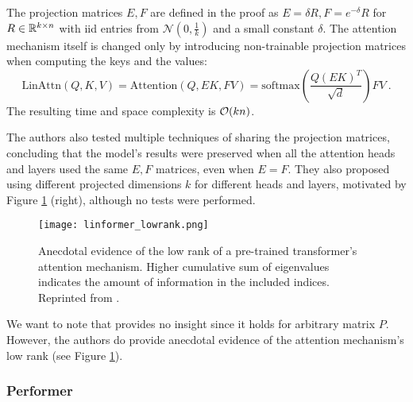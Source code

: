 The projection matrices $E, F$ are defined in the proof as $E=\delta R, F=e^{-\delta}R$ for $R\in\mathbb{R}^{k\times n}$ with iid entries from $\mathcal{N}(0,\frac{1}{k})$ and a small constant $\delta$.
The attention mechanism itself is changed only by introducing non-trainable projection matrices when computing the keys and the values:
\begin{equation}
        \text{LinAttn}(Q,K,V)=\text{Attention}(Q,EK,FV)=
        \text{softmax}\left(\frac{Q(EK)^T}{\sqrt{d}}\right)FV
        \ .
\end{equation}
The resulting time and space complexity is $\mathcal{O}(kn)$. 

The authors also tested multiple techniques of sharing the projection matrices, concluding that the model's results were preserved when all the attention heads and layers used the same $E,F$ matrices, even when $E=F$.
They also proposed using different projected dimensions $k$ for different heads and layers, motivated by Figure \ref{fig:linformer_lowrank} (right), although no tests were performed.

\begin{figure}[!htb]
        \centering
        \texttt{[image: linformer\_lowrank.png]}
        \caption[Rank of the Attention Mechanism]{Anecdotal evidence of the low rank of a pre-trained transformer's attention mechanism. Higher cumulative sum of eigenvalues indicates the amount of information in the included indices. Reprinted from \citep{linformer}.}
        \label{fig:linformer_lowrank}
\end{figure}

We want to note that \citep[Theorem 1]{linformer} provides no insight since it holds for arbitrary matrix $P$. 
However, the authors do provide anecdotal evidence of the
attention mechanism’s low rank (see Figure \ref{fig:linformer_lowrank}).

\subsubsection{Performer}

